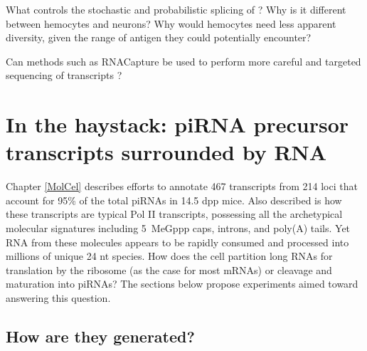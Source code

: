   What controls the stochastic and probabilistic splicing of \dscam{}? Why is it different between hemocytes and neurons? Why would hemocytes need less apparent diversity, given the range of antigen they could potentially encounter?

  Can methods such as RNACapture be used to perform more careful and targeted sequencing of \dscam{} transcripts \citep{Mercer2014}?


\section{In the haystack: piRNA precursor transcripts surrounded by RNA}
  \label{Disc:sec:piRNA precursors}


  Chapter \ref{MolCel} describes efforts to annotate 467 transcripts from 214 loci that account for 95\% of the total piRNAs in 14.5 dpp mice. Also described is how these transcripts are typical Pol II transcripts, possessing all the archetypical molecular signatures including 5\textprime~MeGppp caps, introns, and poly(A) tails. Yet RNA from these molecules appears to be rapidly consumed and processed into millions of unique 24 nt species. How does the cell partition long RNAs for translation by the ribosome (as the case for most mRNAs) or cleavage and maturation into piRNAs? The sections below propose experiments aimed toward answering this question.

  \subsection{How are they generated?}\label{Disc:subsec:How are precursors generated}


